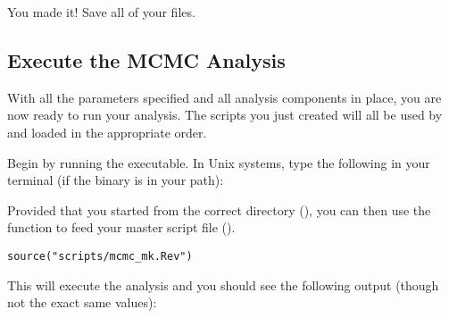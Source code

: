 {\begin{framed}
You made it! Save all of your files.
\end{framed}}

\bigskip
\subsection{Execute the MCMC Analysis}\label{subsect:Exercise-RunMCMC}

With all the parameters specified and all analysis components in place, you are now ready to run your analysis. 
The \Rev scripts you just created will all be used by \RevBayes and loaded in the appropriate order.

{\begin{framed}
Begin by running the \RevBayes executable. In Unix systems, type the following in your terminal (if the \RevBayes binary is in your path):

\colorbox{black}{\strut\hspace{1mm}\textcolor[rgb]{0,1,1}{}\hspace{0.925\textwidth}}
\end{framed}}

Provided that you started \RevBayes from the correct directory (), you can then use the  function to feed \RevBayes your master script file ().
{\tt \begin{snugshade*}
\begin{lstlisting}
source("scripts/mcmc_mk.Rev")
\end{lstlisting}
\end{snugshade*}}

This will execute the analysis and you should see the following output (though not the exact same values):


